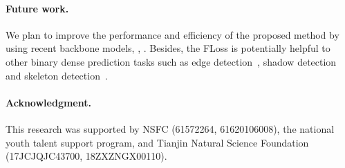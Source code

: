 \documentclass[10pt,twocolumn,letterpaper]{article}
\begin{document}
\paragraph{Future work.}
We plan to improve the performance and efficiency of the proposed method
by using recent backbone models, \eg, \cite{gao2019res2net,MobileNetV2}.
%
Besides, the FLoss is potentially helpful to other binary dense prediction tasks
such as edge detection~\cite{RcfEdgePami2019}, shadow detection~\cite{Hu_2018_CVPR}
and skeleton detection~\cite{zhao2018hifi}.


\paragraph{Acknowledgment.}
This research was supported by NSFC (61572264, 61620106008), 
the national youth talent support program, 
and Tianjin Natural Science Foundation (17JCJQJC43700, 18ZXZNGX00110).

{\small


}
\end{document}
